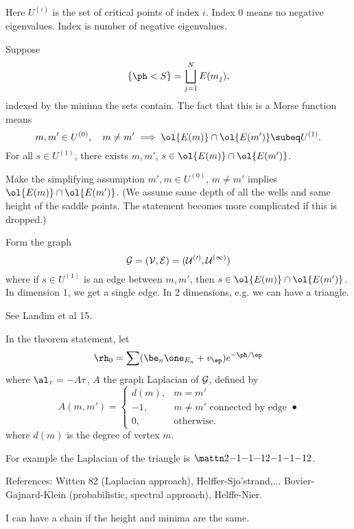 Here $U^{(i)}$ is the set of critical points of index $i$. 
Index 0 means no negative eigenvalues. Index is number of negative eigenvalues.

Suppose 
$$
\{\ph<S\} = \bigsqcup_{j=1}^N E(m_j),
$$
indexed by the minima the sets contain.
The fact that this is a Morse function means 
$$
m, m'\in U^{(0)}, \quad m\ne m' \implies \ol{E(m)}\cap \ol{E(m')} \subeq U^{(1)}.
$$
For all $s\in U^{(1)}$, there exists $m,m'$, $s\in \ol{E(m)}\cap \ol{E(m')}$.

Make the simplifying assumption $m',m\in U^{(0)}$, $m\ne m'$ implies $\ol{E(m)}\cap \ol{E(m')}$. %
(We assume same depth of all the wells and same height of the saddle points. The statement becomes more complicated if this is dropped.)

Form the graph
$$
\cal G = (V,E) = (U^{(0)}, U^{(1)})
$$
where if $s\in U^{(1)}$ is an edge between $m,m'$, then $s\in \ol{E(m)}\cap \ol{E(m')}$.  In dimension 1, we get a single edge. In 2 dimensions, e.g. we can have a triangle.

See Landim et al 15.

In the theorem statement, let
$$
\rh_0 = \sum (\be_n \one_{E_n} + v_\ep) e^{-\ph/\ep}
$$
where $\al_\tau = -A\tau$, $A$ the graph Laplacian of $\cal G$, defined by 
$$
A(m,m') = \begin{cases}
d(m),&m=m'\\
-1,&m\ne m' \text{ connected by edge}\\
0,&\text{otherwise}.
\end{cases}•
$$
where $d(m)$ is the degree of vertex $m$.

For example the Laplacian of the triangle is $\mattn 2{-1}{-1}{-1}2{-1}{-1}{-1}2$.

References: Witten 82 (Laplacian approach), Helffer-Sjo'strand,... Bovier-Gajnard-Klein (probabilistic, spectral approach), Helffe-Nier.

I can have a chain if the height and minima are the same.

